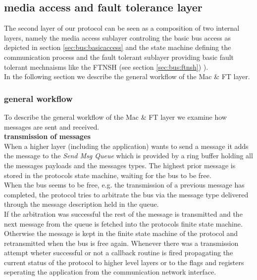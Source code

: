 \subsection{media access and fault tolerance layer}
\label{sec:bus:design:layer2}

The second layer of our protocol can be seen as a composition of two internal layers, 
namely the media access sublayer controling the basic bus access as depicted in section 
\ref{sec:bus:basicaccess}  and the state machine defining 
the communication process and the fault tolerant sublayer providing basic fault 
tolerant mechnaisms like the FTNSH (see section \ref{sec:bus:ftnsh}) ).\\

In the following section we describe the general workflow of the Mac \& FT layer.\\

\subsubsection{general workflow}

To describe the general workflow of the Mac \& FT layer we examine how messages are sent and received.\\

\textbf{transmission of messages}\\
When a higher layer (including the application) wants to send a message it adds the message to the \textit{Send Msg Queue} which is provided
by a ring buffer holding all the messages payloads and the messages types. The highest prior message is stored in the protocols state machine, waiting for the bus to be free.\\

When the bus seems to be free, e.g. the transmission of a previous message has completed, the protocol tries to arbitrate the bus via the message type delivered through the message description held in the queue.\\

If the arbitration was successful the rest of the message is transmitted and the next message from the queue is fetched into the protocols finite state machine. Otherwise the message is kept in the finite state machine of the protocol and retransmitted when the bus is free again.
Whenever there was a transmission attempt wheter successful or not a callback routine is fired propagating the current status of the protocol to higher level layers or to the flags and registers seperating the application from the communication network interface.\\

